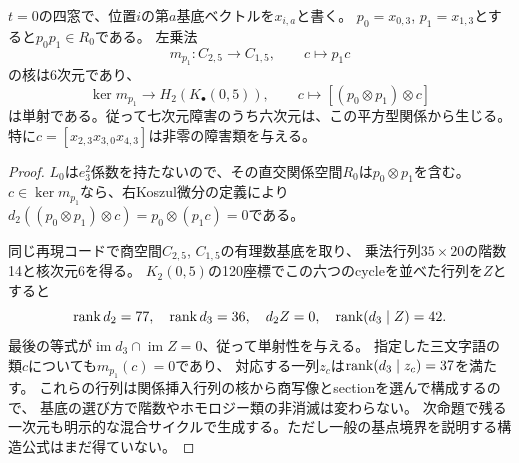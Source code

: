 \begin{proposition}[平方関係が与える六つの五次障害]\label{prop:boundary-square-cycles}
$t=0$の四窓で、位置$i$の第$a$基底ベクトルを$x_{i,a}$と書く。
$p_0=x_{0,3}$, $p_1=x_{1,3}$とすると$p_0p_1\in R_0$である。
左乗法
\[
 m_{p_1}:C_{2,5}\longrightarrow C_{1,5},\qquad c\longmapsto p_1c
\]
の核は6次元であり、
\[
 \ker m_{p_1}\longrightarrow H_2(K_\bullet(0,5)),\qquad
 c\longmapsto[(p_0\otimes p_1)\otimes c]
\]
は単射である。従って七次元障害のうち六次元は、この平方型関係から生じる。
特に$c=[x_{2,3}x_{3,0}x_{4,3}]$は非零の障害類を与える。
\end{proposition}
\begin{proof}
$L_0$は$e_3^2$係数を持たないので、その直交関係空間$R_0$は$p_0\otimes p_1$を含む。
$c\in\ker m_{p_1}$なら、右Koszul微分の定義により
$d_2((p_0\otimes p_1)\otimes c)=p_0\otimes(p_1c)=0$である。

同じ再現コードで商空間$C_{2,5}$, $C_{1,5}$の有理数基底を取り、
乗法行列$35\times20$の階数14と核次元6を得る。
$K_2(0,5)$の120座標でこの六つのcycleを並べた行列を$Z$とすると
\[
 \operatorname{rank} d_2=77,\quad\operatorname{rank} d_3=36,\quad d_2Z=0,\quad\operatorname{rank}(d_3\mid Z)=42.
\]
最後の等式が$\operatorname{im}d_3\cap\operatorname{im}Z=0$、従って単射性を与える。
指定した三文字語の類$c$についても$m_{p_1}(c)=0$であり、
対応する一列$z_c$は$\operatorname{rank}(d_3\mid z_c)=37$を満たす。
これらの行列は関係挿入行列の核から商写像とsectionを選んで構成するので、
基底の選び方で階数やホモロジー類の非消滅は変わらない。
次命題で残る一次元も明示的な混合サイクルで生成する。ただし一般の基点境界を説明する構造公式はまだ得ていない。
\end{proof}


